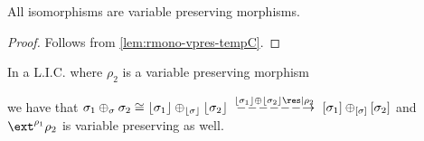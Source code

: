 \begin{lemma}\label{lem:iso-vpres}
    All isomorphisms are variable preserving morphisms.
\end{lemma}
\begin{proof} Follows from \cref{lem:rmono-vpres-tempC}. \end{proof}

\begin{lemma}\label{lem:lic-vpres}
    In a L.I.C. where $\rho_2$ is a variable preserving morphism
    \begin{center}
    \end{center}
    we have that $\sigma_1 \liplus\sigma \sigma_2 \iso \concL{\sigma_1} \liplus{\concL\sigma} \concL{\sigma_2} \xdashto{\concL{\sigma_1} \mplus \concL{\sigma_2}\res|{\rho_2}}
                                                                                                       \anyL{\sigma_1} \liplus{\anyL\sigma} \anyL{\sigma_2}$ and
                 $\ext^{\rho_1}\rho_2$ is variable preserving as well.
\end{lemma}
